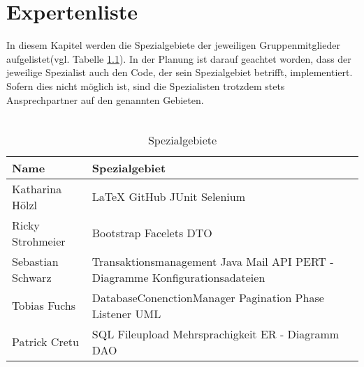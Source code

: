 \chapter{Expertenliste}

In diesem Kapitel werden die Spezialgebiete der jeweiligen Gruppenmitglieder aufgelistet(vgl. Tabelle \ref{fig:spezialgebiete}).
In der Planung ist darauf geachtet worden, dass der jeweilige Spezialist auch den Code, der sein
Spezialgebiet betrifft, implementiert.
Sofern dies nicht möglich ist, sind die Spezialisten trotzdem stets Ansprechpartner auf
den genannten Gebieten.\ \\
\ \\
\begin{table}[h]
	\begin{center}
	\begin{tabular}{|p{6cm}|p{6cm}|}
		\hline \textbf{Name} & \textbf{Spezialgebiet}  \\ 
		\hline Katharina Hölzl & LaTeX \newline
		                         GitHub \newline
		                         JUnit \newline
		                         Selenium    \\ 
		\hline Ricky Strohmeier & Bootstrap \newline
		                          Facelets \newline
		                          DTO  \\ 
		\hline Sebastian Schwarz & Transaktionsmanagement \newline
		                           Java Mail API \newline
		                           PERT - Diagramme \newline
		                           Konfigurationsadateien \\ 
		\hline Tobias Fuchs &    DatabaseConenctionManager \newline
		                         Pagination \newline
		                         Phase Listener \newline
		                         UML \\ 
		\hline Patrick Cretu &  SQL \newline
		                        Fileupload \newline
		                        Mehrsprachigkeit \newline
		                        ER - Diagramm \newline
		                        DAO\\ 
		\hline 
	\end{tabular} 
\caption{Spezialgebiete}
\label{fig:spezialgebiete}
\end{center}
\end{table}
